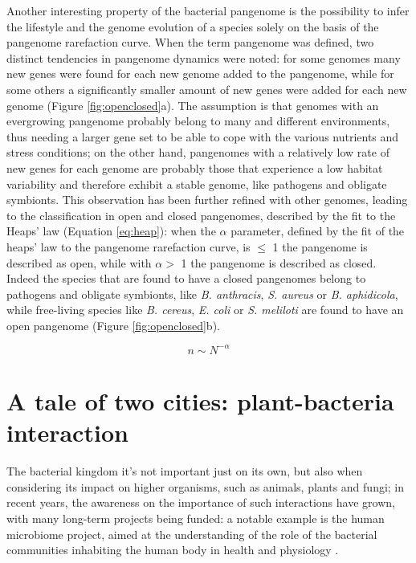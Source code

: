 Another interesting property of the bacterial pangenome is the possibility to infer the lifestyle and the genome evolution of a species solely on the basis of the pangenome rarefaction curve. When the term pangenome was defined, two distinct tendencies in pangenome dynamics were noted: for some genomes many new genes were found for each new genome added to the pangenome, while for some others a significantly smaller amount of new genes were added for each new genome \cite{medini2005microbial} (Figure \ref{fig:openclosed}a). The assumption is that genomes with an evergrowing pangenome probably belong to many and different environments, thus needing a larger gene set to be able to cope with the various nutrients and stress conditions; on the other hand, pangenomes with a relatively low rate of new genes for each genome are probably those that experience a low habitat variability and therefore exhibit a stable genome, like pathogens and obligate symbionts. This observation has been further refined with other genomes, leading to the classification in open and closed pangenomes, described by the fit to the Heaps' law (Equation \ref{eq:heap}): when the $\alpha$ parameter, defined by the fit of the heaps' law to the pangenome rarefaction curve, is $\leq$ 1 the pangenome is described as open, while with $\alpha >$ 1 the pangenome is described as closed. Indeed the species that are found to have a closed pangenomes belong to pathogens and obligate symbionts, like \textit{B. anthracis}, \textit{S. aureus} or \textit{B. aphidicola}, while free-living species like \textit{B. cereus}, \textit{E. coli} or \textit{S. meliloti} are found to have an open pangenome \cite{tettelin2008comparative} (Figure \ref{fig:openclosed}b).

\begin{equation}
\label{eq:heap}
n \sim N^{-\alpha}
\end{equation}


\newpage
\section{A tale of two cities: plant-bacteria interaction}
\label{atale2cities}
The bacterial kingdom it's not important just on its own, but also when considering its impact on higher organisms, such as animals, plants and fungi; in recent years, the awareness on the importance of such interactions have grown, with many long-term projects being funded: a notable example is the human microbiome project, aimed at the understanding of the role of the bacterial communities inhabiting the human body in health and physiology \cite{turnbaugh2007human}.

